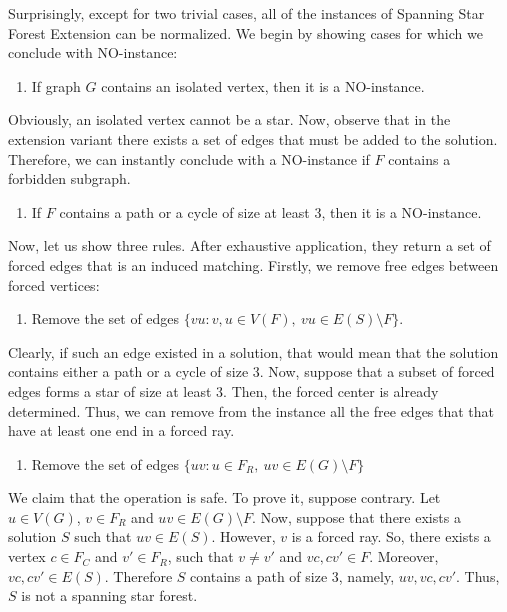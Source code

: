 \documentclass[en]{pracamgr}
\newcommand{\ssfep}{{\sc Spanning Star Forest Extension}}
\begin{document}
Surprisingly, except for two trivial cases, all of the instances of \ssfep{} can be normalized. We begin by showing cases for which we conclude with NO-instance:
\begin{enumerate}[leftmargin=*,label=\textbf{Reduction \arabic{enumi}},labelindent=0pt]
	\item If graph $G$ contains an isolated vertex, then it is a NO-instance.
\end{enumerate}

Obviously, an isolated vertex cannot be a star. Now, observe that in the extension variant there exists a set of edges that must be added to the solution. Therefore, we can instantly conclude with a NO-instance if $F$ contains a forbidden subgraph.

\begin{enumerate}[leftmargin=*,label=\textbf{Reduction \arabic{enumi}},labelindent=0pt,resume]
	\item If $F$ contains a path or a cycle of size at least $3$, then it is a NO-instance.
\end{enumerate}

Now, let us show three rules. After exhaustive application, they return a set of forced edges that is an induced matching. Firstly, we remove free edges between forced vertices:

\begin{enumerate}[leftmargin=*,label=\textbf{Reduction \arabic{enumi}},labelindent=0pt,resume]
	\item Remove the set of edges $\{vu: v,u \in V(F),\ vu \in E(S) \setminus F\}$.
\end{enumerate}

Clearly, if such an edge existed in a solution, that would mean that the solution contains either a path or a cycle of size $3$. Now, suppose that a subset of forced edges forms a star of size at least $3$. Then, the forced center is already determined. Thus, we can remove from the instance all the free edges that that have at least one end in a forced ray. 

\begin{enumerate}[leftmargin=*,label=\textbf{Reduction \arabic{enumi}},resume,wide, labelwidth=!, labelindent=0pt]
	\item Remove the set of edges $\{uv: u \in F_R,\ uv \in E(G) \setminus F\}$
\end{enumerate}

We claim that the operation is safe. To prove it, suppose contrary. Let $u \in V(G)$, $v \in F_R$ and $uv \in E(G) \setminus F$. Now, suppose that there exists a solution $S$ such that $uv \in E(S)$. However, $v$ is a forced ray. So, there exists a vertex $c \in F_C$ and $v' \in F_R$, such that $v \neq v'$ and $vc,cv' \in F$. Moreover, $vc,cv' \in E(S)$. Therefore $S$ contains a path of size $3$, namely, $uv,vc,cv'$. Thus, $S$ is not a spanning star forest.
\end{document}
